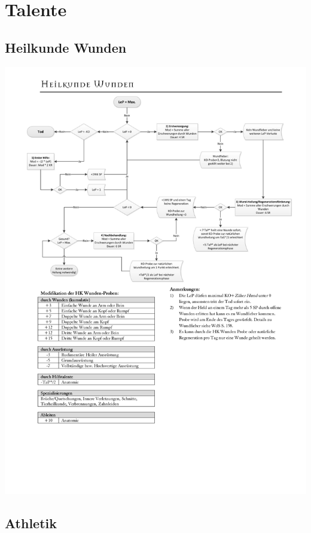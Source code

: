 \chapter{Talente}
\section{Heilkunde Wunden}
\begin{minipage}{\textwidth}
    \begin{center}
        \includegraphics[width=0.7\linewidth,height=0.7\textheight, keepaspectratio]{Talente/HeilkundeWunden/HK-Wunden.png}
    \end{center}
\end{minipage}
\section{Athletik}

